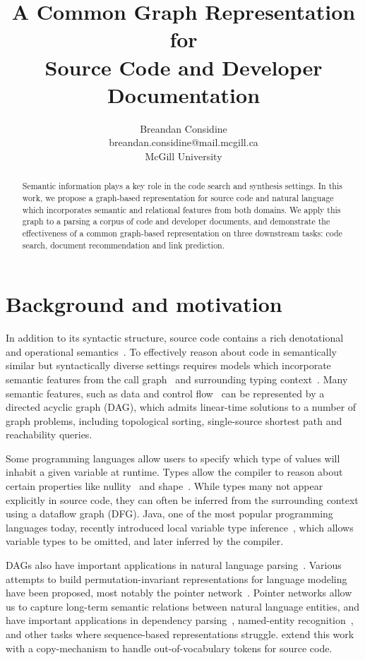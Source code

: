 \documentclass{article}
\title{A Common Graph Representation for\\Source Code and Developer Documentation}
\author{Breandan Considine\\
breandan.considine@mail.mcgill.ca\\
McGill University}
\begin{document}
\maketitle

\begin{abstract}
Semantic information plays a key role in the code search and synthesis settings. In this work, we propose a graph-based representation for source code and natural language which incorporates semantic and relational features from both domains. We apply this graph to a parsing a corpus of code and developer documents, and demonstrate the effectiveness of a common graph-based representation on three downstream tasks: code search, document recommendation and link prediction.
\end{abstract}

\section{Background and motivation}

In addition to its syntactic structure, source code contains a rich denotational and operational semantics~\citep{henkel2018code}. To effectively reason about code in semantically similar but syntactically diverse settings requires models which incorporate semantic features from the call graph~\citep{gu2016deep} and surrounding typing context~\citep{allamanis2017learning}. Many semantic features, such as data and control flow~\citep{si2018learning} can be represented by a directed acyclic graph (DAG), which admits linear-time solutions to a number of graph problems, including topological sorting, single-source shortest path and reachability queries.

Some programming languages allow users to specify which type of values will inhabit a given variable at runtime. Types allow the compiler to reason about certain properties like nullity~\citep{ekman2007pluggable} and shape~\citep{considine2019kotlingrad}. While types many not appear explicitly in source code, they can often be inferred from the surrounding context using a dataflow graph (DFG). Java, one of the most popular programming languages today, recently introduced local variable type inference~\citet{liddell2019analyzing}, which allows variable types to be omitted, and later inferred by the compiler.

DAGs also have important applications in natural language parsing~\citep{sagae2008shift, quernheim2012dagger}. Various attempts to build permutation-invariant representations for language modeling have been proposed, most notably the pointer network~\citep{vinyals2015pointer}. Pointer networks allow us to capture long-term semantic relations between natural language entities, and have important applications in dependency parsing~\citep{ma2018stack}, named-entity recognition~\citep{lample2016neural}, and other tasks where sequence-based representations struggle. \citet{li2017code} extend this work with a copy-mechanism to handle out-of-vocabulary tokens for source code.
\end{document}
